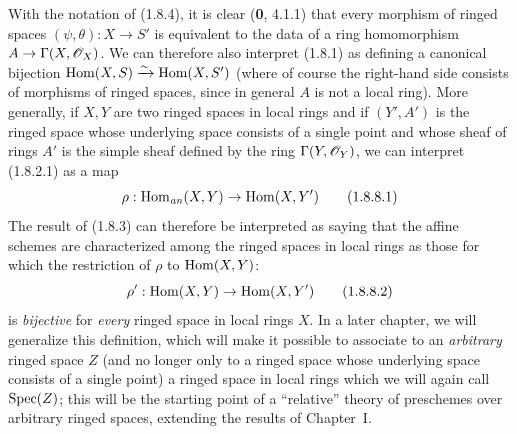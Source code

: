 \begin{env}[1.8.8]
\label{ega2:addendum:I.1.8.8}
With the notation of (1.8.4), it is clear (\textbf{0}, 4.1.1) that every
morphism of ringed spaces $(\psi,\theta):X\to S'$ is equivalent to the
data of a ring homomorphism
$A\to\Gamma(X,\mathscr{O}_X)$. We can therefore also interpret (1.8.1)
as defining a canonical bijection $\operatorname{Hom}(X,S)\xrightarrow{\sim}\operatorname{Hom}(X,S')$
(where of course the right-hand side consists of morphisms of ringed
spaces, since in general $A$ is not a local ring). More
generally, if $X,Y$ are two ringed spaces in local rings and
if $(Y',A')$ is the ringed space whose underlying space consists of a
single point and whose sheaf of rings $A'$ is the simple sheaf
defined by the ring $\Gamma(Y,\mathscr{O}_Y)$, we can interpret
(1.8.2.1) as a map
\begin{equation}
\label{ega2:addendum:I.1.8.8.1}
  \rho:\operatorname{Hom}_{\mathit{an}}(X,Y)\to\operatorname{Hom}(X,Y')
\tag{1.8.8.1}
\end{equation}
The result of (1.8.3) can therefore be interpreted as saying that the affine
schemes are characterized among the ringed spaces in local rings
as those for which the restriction of $\rho$ to $\operatorname{Hom}(X,Y)$:
\begin{equation}
\label{ega2:addendum:I.1.8.8.2}
  \rho':\operatorname{Hom}(X,Y)\to\operatorname{Hom}(X,Y')
\tag{1.8.8.2}
\end{equation}
is \emph{bijective} for \emph{every} ringed space in local rings $X$. In a
later chapter, we will generalize this definition, which will
make it possible to associate to an \emph{arbitrary} ringed space $Z$ (and no longer
only to a ringed space whose underlying space consists of a single
point) a ringed space in local rings which we will again call
$\operatorname{Spec}(Z)$; this will be the starting point of a ``relative'' theory of
preschemes over arbitrary ringed spaces, extending the
results of Chapter~I.
\end{env}

